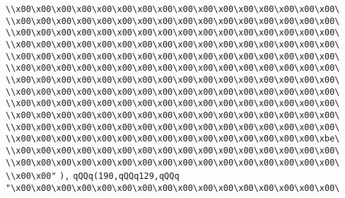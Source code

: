 \verb|\\x00\x00\x00\x00\x00\x00\x00\x00\x00\x00\x00\x00\x00\x00\x00\x00\|\newline
\verb|\\x00\x00\x00\x00\x00\x00\x00\x00\x00\x00\x00\x00\x00\x00\x00\x00\|\newline
\verb|\\x00\x00\x00\x00\x00\x00\x00\x00\x00\x00\x00\x00\x00\x00\x00\x00\|\newline
\verb|\\x00\x00\x00\x00\x00\x00\x00\x00\x00\x00\x00\x00\x00\x00\x00\x00\|\newline
\verb|\\x00\x00\x00\x00\x00\x00\x00\x00\x00\x00\x00\x00\x00\x00\x00\x00\|\newline
\verb|\\x00\x00\x00\x00\x00\x00\x00\x00\x00\x00\x00\x00\x00\x00\x00\x00\|\newline
\verb|\\x00\x00\x00\x00\x00\x00\x00\x00\x00\x00\x00\x00\x00\x00\x00\x00\|\newline
\verb|\\x00\x00\x00\x00\x00\x00\x00\x00\x00\x00\x00\x00\x00\x00\x00\x00\|\newline
\verb|\\x00\x00\x00\x00\x00\x00\x00\x00\x00\x00\x00\x00\x00\x00\x00\x00\|\newline
\verb|\\x00\x00\x00\x00\x00\x00\x00\x00\x00\x00\x00\x00\x00\x00\x00\x00\|\newline
\verb|\\x00\x00\x00\x00\x00\x00\x00\x00\x00\x00\x00\x00\x00\x00\x00\x00\|\newline
\verb|\\x00\x00\x00\x00\x00\x00\x00\x00\x00\x00\x00\x00\x00\x00\x00\xbe\|\newline
\verb|\\x00\x00\x00\x00\x00\x00\x00\x00\x00\x00\x00\x00\x00\x00\x00\x00\|\newline
\verb|\\x00\x00\x00\x00\x00\x00\x00\x00\x00\x00\x00\x00\x00\x00\x00\x00\|\newline
\verb|\\x00\x00"|\newline
\verb|),|\newline
\verb|qQQq(190,qQQq129,qQQq|\newline
\verb|"\x00\x00\x00\x00\x00\x00\x00\x00\x00\x00\x00\x00\x00\x00\x00\x00\|\newline
